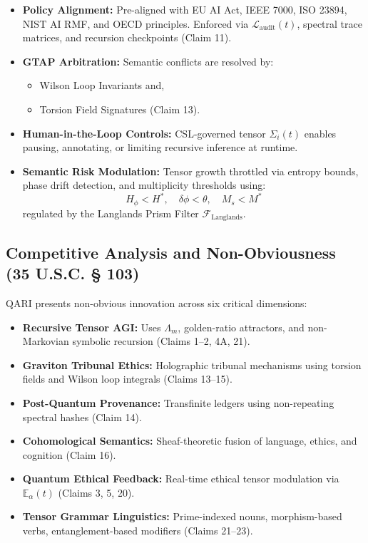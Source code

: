 \documentclass[12pt]{article}
\begin{document}
\begin{itemize}
    \item \textbf{Policy Alignment:} Pre-aligned with EU AI Act, IEEE 7000, ISO 23894, NIST AI RMF, and OECD principles. Enforced via \( \mathcal{L}_{\text{audit}}(t) \), spectral trace matrices, and recursion checkpoints (Claim 11).

    \item \textbf{GTAP Arbitration:} Semantic conflicts are resolved by:
    \begin{itemize}
        \item Wilson Loop Invariants and,
        \item Torsion Field Signatures (Claim 13).
    \end{itemize}

    \item \textbf{Human-in-the-Loop Controls:} CSL-governed tensor \( \Sigma_i(t) \) enables pausing, annotating, or limiting recursive inference at runtime.

    \item \textbf{Semantic Risk Modulation:} Tensor growth throttled via entropy bounds, phase drift detection, and multiplicity thresholds using:
    \[
        H_\phi < H^*, \quad \delta\phi < \theta, \quad M_s < M^*
    \]
    regulated by the Langlands Prism Filter \( \mathcal{F}_{\text{Langlands}} \).
\end{itemize}

\subsection{Competitive Analysis and Non-Obviousness (35 U.S.C. § 103)}

QARI presents non-obvious innovation across six critical dimensions:

\begin{itemize}
    \item \textbf{Recursive Tensor AGI:} Uses \( \Lambda_m \), golden-ratio attractors, and non-Markovian symbolic recursion (Claims 1–2, 4A, 21).

    \item \textbf{Graviton Tribunal Ethics:} Holographic tribunal mechanisms using torsion fields and Wilson loop integrals (Claims 13–15).

    \item \textbf{Post-Quantum Provenance:} Transfinite ledgers using non-repeating spectral hashes (Claim 14).

    \item \textbf{Cohomological Semantics:} Sheaf-theoretic fusion of language, ethics, and cognition (Claim 16).

    \item \textbf{Quantum Ethical Feedback:} Real-time ethical tensor modulation via \( \mathbb{E}_\alpha(t) \) (Claims 3, 5, 20).

    \item \textbf{Tensor Grammar Linguistics:} Prime-indexed nouns, morphism-based verbs, entanglement-based modifiers (Claims 21–23).
\end{itemize}
\end{document}
